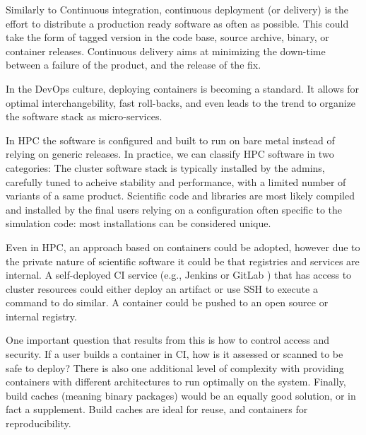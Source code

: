 Similarly to Continuous integration, continuous deployment (or delivery) is the
effort to distribute a production ready software as often as possible. This
could take the form of tagged version in the code base, source archive, binary,
or container releases. Continuous delivery aims at minimizing the down-time
between a failure of the product, and the release of the fix.

In the DevOps culture, deploying containers is becoming a standard. It allows
for optimal interchangebility, fast roll-backs, and even leads to the trend
to organize the software stack as micro-services.

In HPC the software is configured and built to run on bare metal instead of
relying on generic releases. In practice, we can classify HPC software in two
categories: The cluster software stack is typically installed by the admins,
carefully tuned to acheive stability and performance, with a limited number of
variants of a same product. Scientific code and libraries are most likely
compiled and installed by the final users relying on a configuration often
specific to the simulation code: most installations can be considered unique.

Even in HPC, an approach based on containers could be adopted, however due to
the private nature of scientific software it could be that registries and
services are internal. A self-deployed CI service (e.g., Jenkins or GitLab
\cite{jenkins,gitlab}) that has access to cluster resources could either deploy
an artifact or use SSH to execute a command to do similar. A container could be
pushed to an open source or internal registry.

One important question that results from this is how to control access and
security. If a user builds a container in CI, how is it assessed or scanned to
be safe to deploy?  There is also one additional level of complexity with
providing containers with different architectures to run optimally on the
system. Finally, build caches (meaning binary packages) would be an equally
good solution, or in fact a supplement. Build caches are ideal for reuse, and
containers for reproducibility.
